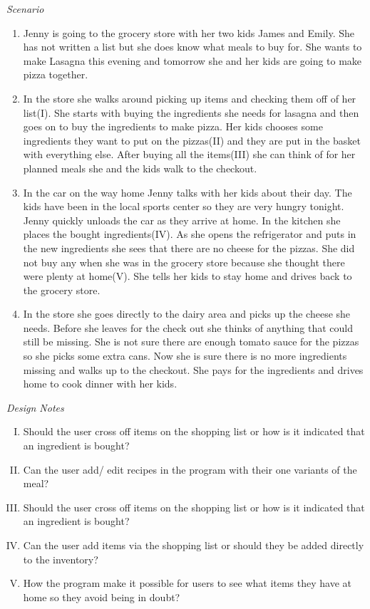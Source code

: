 \emph{Scenario}
\begin{enumerate}
\item Jenny is going to the grocery store with her two kids James and Emily. She has not written a list but she does know what meals to buy for. She wants to make Lasagna this evening and tomorrow she and her kids are going to make pizza together. 
\item In the store she walks around picking up items and checking them off of her list(I). She starts with buying the ingredients she needs for lasagna and then goes on to buy the ingredients to make pizza. Her kids chooses some ingredients they want to put on the pizzas(II) and they are put in the basket with everything else. After buying all the items(III) she can think of for her planned meals she and the kids walk to the checkout. 
\item In the car on the way home Jenny talks with her kids about their day. The kids have been in the local sports center so they are very hungry tonight. Jenny quickly unloads the car as they arrive at home. In the kitchen she places the bought ingredients(IV). As she opens the refrigerator and puts in the new ingredients she sees that there are no cheese for the pizzas. She did not buy any when she was in the grocery store because she thought there were plenty at home(V). She tells her kids to stay home and drives back to the grocery store.
\item In the store she goes directly to the dairy area and picks up the cheese she needs. Before she leaves for the check out she thinks of anything that could still be missing. She is not sure there are enough tomato sauce for the pizzas so she picks some extra cans. Now she is sure there is no more ingredients missing and walks up to the checkout. She pays for the ingredients and drives home to cook dinner with her kids.  
\end{enumerate}

\emph{Design Notes}

\begin{enumerate} [(I)]
\item Should the user cross off items on the shopping list or how is it indicated that an ingredient is bought?  
\item Can the user add/ edit recipes in the program with their one variants of the meal?
\item Should the user cross off items on the shopping list or how is it indicated that an ingredient is bought? 
\item Can the user add items via the shopping list or should they be added directly to the inventory?
\item How the program make it possible for users to see what items they have at home so they avoid being in doubt?
\end{enumerate}

